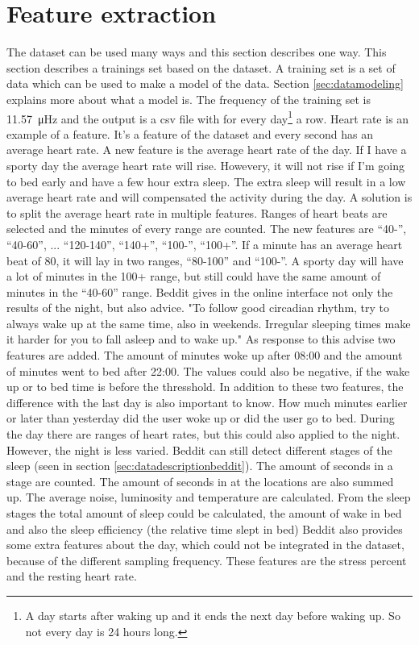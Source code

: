 	\section{Feature extraction}
				The dataset can be used many ways and this section describes one way. This section describes a trainings set based on the dataset. A training set is a set of data which can be used to make a model of the data. Section \ref{sec:datamodeling} explains more about what a model is. The frequency of the training set is \SI{11.57}{\micro\hertz} and the output is a csv file with for every day\footnote{A day starts after waking up and it ends the next day before waking up. So not every day is 24 hours long.} a row. Heart rate is an example of a feature. It's a feature of the dataset and every second has an average heart rate. A new feature is the average heart rate of the day. If I have a sporty day the average heart rate will rise. Howevery, it will not rise if I'm going to bed early and have a few hour extra sleep. The extra sleep will result in a low average heart rate and will compensated the activity during the day. A solution is to split the average heart rate in multiple features. Ranges of heart beats are selected and the minutes of every range are counted. The new features are ``40-'', ``40-60'', ... ``120-140'', ``140+'', ``100-'', ``100+''. If a minute has an average heart beat of 80, it will lay in two ranges, ``80-100'' and ``100-''. A sporty day will have a lot of minutes in the 100+ range, but still could have the same amount of minutes in the ``40-60'' range. 
			Beddit gives in the online interface not only the results of the night, but also advice. "To follow good circadian rhythm, try to always wake up at the same time, also in weekends. Irregular sleeping times make it harder for you to fall asleep and to wake up." As response to this advise two features are added. The amount of minutes woke up after 08:00 and the amount of minutes went to bed after 22:00. The values could also be negative, if the wake up or to bed time is before the thresshold. In addition to these two features, the difference with the last day is also important to know. How much minutes earlier or later than yesterday did the user woke up or did the user go to bed. 
			During the day there are ranges of heart rates, but this could also applied to the night. However, the night is less varied. Beddit can still detect different stages of the sleep (seen in section \ref{sec:datadescriptionbeddit}). The amount of seconds in a stage are counted.
			The amount of seconds in at the locations are also summed up.	
			The average noise, luminosity and temperature are calculated.
			From the sleep stages the total amount of sleep could be calculated, the amount of wake in bed and also the sleep efficiency (the relative time slept in bed)
			 Beddit also provides some extra features about the day, which could not be integrated in the dataset, because of the different sampling frequency. These features are the stress percent and the resting heart rate. 

